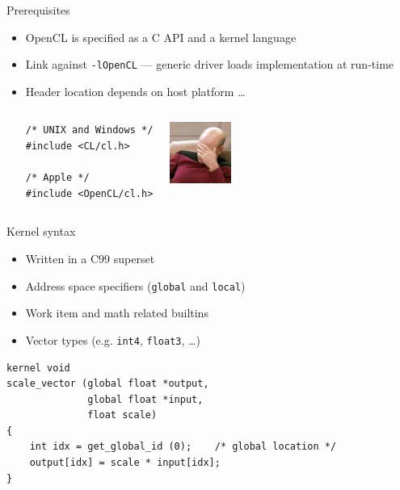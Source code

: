 \documentclass[18pt]{beamer}
\newenvironment{code}[1][\linewidth]
  {\begin{mdframed}[
  skipabove=\topsep,
  skipbelow=\topsep,
  linecolor=black!9,
  backgroundcolor=black!9,
  innertopmargin=0ex,
  innerbottommargin=-.5ex,
  innerleftmargin=6pt,
  innerrightmargin=6pt,
  userdefinedwidth=#1]}
  {\end{mdframed}}
\begin{document}
\begin{frame}[fragile]{Prerequisites}
  \begin{itemize}
    \item OpenCL is specified as a C API and a kernel language
    \item Link against \texttt{-lOpenCL} --- generic driver loads implementation at
      run-time
    \item Header location depends on host platform \ldots

      \begin{minipage}[htb]{\textwidth}
        \begin{columns}[onlytextwidth]
            \begin{code}
\begin{lstlisting}
/* UNIX and Windows */
#include <CL/cl.h>

/* Apple */
#include <OpenCL/cl.h>
\end{lstlisting}
          \end{code}

            \centering
            \includegraphics[width=2cm]{images/facepalm}
        \end{columns}
      \end{minipage}

  \end{itemize}
\end{frame}
\begin{frame}[fragile]{Kernel syntax}
\begin{itemize}
  \item Written in a C99 superset
  \item Address space specifiers (\texttt{global} and \texttt{local})
  \item Work item and math related builtins
  \item Vector types (e.g. \texttt{int4}, \texttt{float3}, \ldots)
\end{itemize}
  \begin{code}
\begin{lstlisting}
kernel void
scale_vector (global float *output,
              global float *input,
              float scale)
{
    int idx = get_global_id (0);    /* global location */
    output[idx] = scale * input[idx];
}
\end{lstlisting}
\end{code}
\end{frame}
\end{document}
